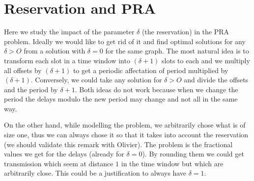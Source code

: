 \documentclass{article}
\begin{document}

\section{Reservation and PRA}


Here we study the impact of the parameter $\delta$ (the reservation) in the PRA problem. 
Ideally we would like to get rid of it and find optimal solutions for any $\delta>O$
from a solution with $\delta = 0$ for the same graph. 
The most natural idea is to transform each slot in a time window into $(\delta+1)$ slots to each and we multiply all offsets by $(\delta+1)$ 
to get a periodic affectation of period multiplied by $(\delta+1)$. Conversely, we could take any solution for $\delta>O$ and divide the offsets and the period by 
$\delta +1$. Both ideas do not work because when we change the period the delays modulo the new period may change and not all in the same way.



On the other hand, while modelling the problem, we arbitrarily chose what is of size one, thus we can always 
chose it so that it takes into account the reservation (we should validate this remark with Olivier). The problem is the 
fractional values we get for the delays (already for $\delta =0$). By rounding them we could get transmission which seem at distance $1$ 
in the time window but which are arbitrarily close. This could be a justification to always have $\delta =1$.  



% 




\end{document}
